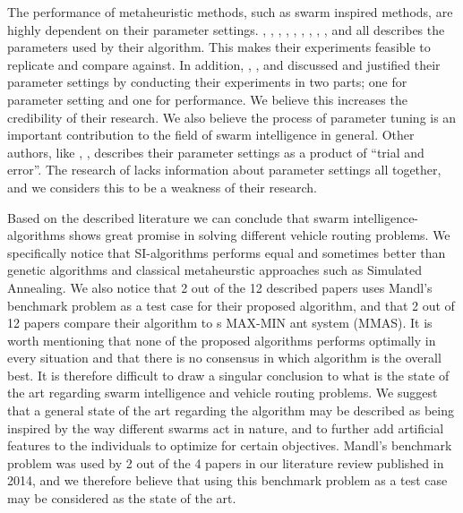 The performance of metaheuristic methods, such as swarm inspired methods, are highly dependent on their parameter settings. \citet{hsiao04}, \citet{salehi-nezhad07}, \citet{tripathi09}, \citet{sedighpour14}, \citet{yang07}, \citet{salehinejad10}, \citet{jiang10}, \citet{poorzahedy11}, \citet{nikolic14}, and \citet{kechagiopoulos14} all describes the parameters used by their algorithm. This makes their experiments feasible to replicate and compare against. In addition, \citet{sedighpour14}, \citet{poorzahedy11}, and \citet{kechagiopoulos14} discussed and justified their parameter settings by conducting their experiments in two parts; one for parameter setting and one for performance. We believe this increases the credibility of their research. We also believe the process of parameter tuning is an important contribution to the field of swarm intelligence in general. Other authors, like \citet{salehi-nezhad07}, \citet{yang07}, describes their parameter settings as a product of ``trial and error''.  The research of \citet{dias14} lacks information about parameter settings all together, and we considers this to be a weakness of their research. \newline

Based on the described literature we can conclude that swarm intelligence-algorithms shows great promise in solving different vehicle routing problems. We specifically notice that SI-algorithms performs equal and sometimes better than genetic algorithms and classical metaheurstic approaches such as Simulated Annealing. We also notice that 2 out of the 12 described papers uses Mandl's benchmark problem as a test case for their proposed algorithm, and that 2 out of 12 papers compare their algorithm to \citet{stutzle99}s MAX-MIN ant system (MMAS). It is worth mentioning that none of the proposed algorithms performs optimally in every situation and that there is no consensus in which algorithm is the overall best. It is therefore difficult to draw a singular conclusion to what is the state of the art regarding swarm intelligence and vehicle routing problems. We suggest that a general state of the art regarding the algorithm may be described as being inspired by the way different swarms act in nature, and to further add artificial features to the individuals to optimize for certain objectives. Mandl's benchmark problem was used by 2 out of the 4 papers in our literature review published in 2014, and we therefore believe that using this benchmark problem as a test case may be considered as the state of the art.




